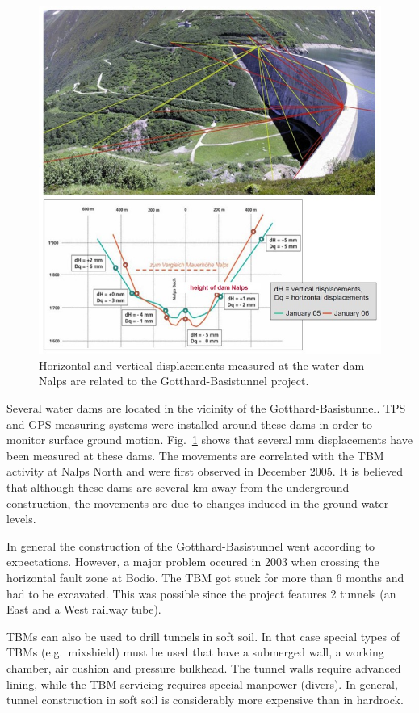 \begin{figure}[htbp!]
\centering
\includegraphics[width=12cm]{./Sec_SiteInfra/Figures/dam.jpg}
\caption{Horizontal and vertical displacements measured at the water dam Nalps
are related to the Gotthard-Basistunnel project.}
\label{fig:dam}
\end{figure}
Several water dams are located in the vicinity of the Gotthard-Basistunnel.
TPS and GPS measuring systems were installed around these dams in order
to monitor surface ground motion. Fig.~\ref{fig:dam} shows that several
mm displacements have been measured at these dams. The movements
are correlated with the TBM activity at Nalps North and were first observed
in December 2005. It is believed that although these dams are several km away
from the underground construction, the movements are due to changes induced
in the ground-water levels.

In general the construction of the Gotthard-Basistunnel went according to
expectations. However, a major problem occured in 2003 when crossing the horizontal
fault zone at Bodio. The TBM got stuck for more than 6 months and had to
be excavated. This was possible since the project features 2 tunnels (an
East and a West railway tube).

TBMs can also be used to drill tunnels in
soft soil. In that case special types of TBMs (e.g.\ mixshield) must be used that have
a submerged wall, a working chamber, air cushion and pressure bulkhead. The
tunnel walls require advanced lining, while the TBM servicing requires special
manpower (divers). In general, tunnel construction in soft soil is considerably more expensive
than in hardrock.

